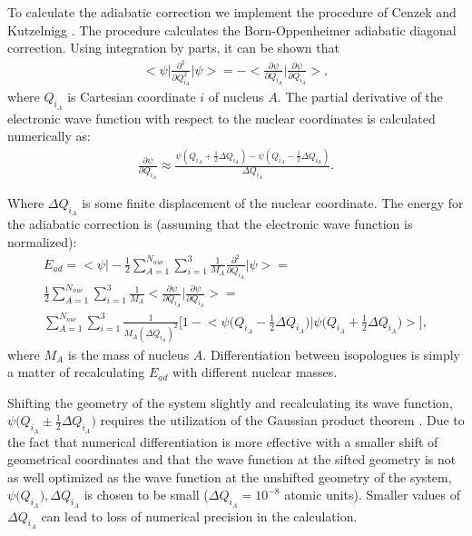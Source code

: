 \documentclass[aps,onecolumn]{revtex4}
\begin{document}
To calculate the adiabatic correction
we implement the procedure of Cenzek and Kutzelnigg \cite{Adiabatic3}. 
The procedure calculates the Born-Oppenheimer adiabatic
diagonal correction. Using integration by parts, it can be shown that
\begin{eqnarray}
\bigg<\psi\bigg|\frac{\partial^2}{\partial Q_{i_A}^2}\bigg|\psi\bigg> = -\bigg<\frac{\partial\psi}{\partial Q_{i_A}}
\bigg|\frac{\partial\psi}{\partial Q_{i_A}}\bigg>,
\end{eqnarray}
where $Q_{i_A}$ is Cartesian coordinate $i$ of nucleus $A$. 
The partial derivative of the electronic wave function
with respect to the nuclear coordinates is calculated numerically as:
\begin{eqnarray}
\frac{\partial\psi}{\partial Q_{i_A}} \approx \frac{\psi(Q_{i_A} + \frac{1}{2}\Delta Q_{i_A}) - 
\psi(Q_{i_A} - \frac{1}{2}\Delta Q_{i_A})}{\Delta Q_{i_A}}.
\end{eqnarray}

Where $\Delta Q_{i_A}$ is some finite displacement of the nuclear coordinate.
The energy for the adiabatic correction is (assuming  that the electronic wave function
is normalized):
\begin{eqnarray}
E_{ad} = \Big<\psi\Big|-\frac{1}{2}\sum_{A=1}^{N_{nuc}}\sum_{i=1}^3\frac{1}{M_A}
\frac{\partial^2}{\partial Q_{i_A}}\Big|\psi\big> = \nonumber\\
\frac{1}{2}\sum_{A=1}^{N_{nuc}}\sum_{i=1}^3\frac{1}{M_A}\Big<\frac{\partial\psi}
{\partial Q_{i_A}}\Big|\frac{\partial\psi}{\partial Q_{i_A}}\Big> = \nonumber\\
\sum_{A=1}^{N_{nuc}}\sum_{i=1}^3\frac{1}{M_A(\Delta Q_{i_A})^2} \bigg[1 -\Big<\psi\Big(
Q_{i_A} - \frac{1}{2}\Delta Q_{i_A}\Big)\Big|\psi\Big(Q_{i_A} + \frac{1}{2}\Delta Q_{i_A}\Big)\Big>
\bigg],
\end{eqnarray}
where $M_A$ is the mass of nucleus $A$. 
Differentiation between isopologues is simply a matter of recalculating
$E_{ad}$ with different nuclear masses.

Shifting the geometry of the system 
slightly and recalculating its wave function, $\psi\Big(Q_{i_A} \pm \frac{1}{2}
\Delta Q_{i_A}\Big)$ requires the utilization of the Gaussian product theorem \cite{ECG_HeH+}. Due to
the fact that numerical differentiation is more effective with a smaller shift of geometrical
coordinates and that
the wave function 
at the sifted geometry is not as well optimized as the wave function 
at the unshifted geometry of the system, $\psi\Big(Q_{i_A}\Big), \Delta Q_{i_A}$
is chosen to be small ($\Delta Q_{i_A} = 10^{-8}$ atomic units). 
Smaller values of $\Delta Q_{i_A}$ can lead
to loss of numerical precision in the calculation.
\end{document}
